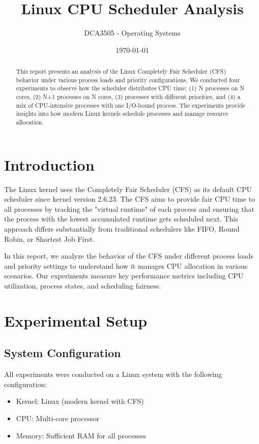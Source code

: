 \documentclass[12pt,a4paper]{article}
\title{\Large\textbf{Linux CPU Scheduler Analysis}}
\author{DCA3505 - Operating Systems}
\date{\today}
\begin{document}
\maketitle

\begin{abstract}
This report presents an analysis of the Linux Completely Fair Scheduler (CFS) behavior under various process loads and priority configurations. We conducted four experiments to observe how the scheduler distributes CPU time: (1) N processes on N cores, (2) N+1 processes on N cores, (3) processes with different priorities, and (4) a mix of CPU-intensive processes with one I/O-bound process. The experiments provide insights into how modern Linux kernels schedule processes and manage resource allocation.
\end{abstract}

\tableofcontents
\newpage

\section{Introduction}

The Linux kernel uses the Completely Fair Scheduler (CFS) as its default CPU scheduler since kernel version 2.6.23. The CFS aims to provide fair CPU time to all processes by tracking the "virtual runtime" of each process and ensuring that the process with the lowest accumulated runtime gets scheduled next. This approach differs substantially from traditional schedulers like FIFO, Round Robin, or Shortest Job First.

In this report, we analyze the behavior of the CFS under different process loads and priority settings to understand how it manages CPU allocation in various scenarios. Our experiments measure key performance metrics including CPU utilization, process states, and scheduling fairness.

\section{Experimental Setup}

\subsection{System Configuration}
All experiments were conducted on a Linux system with the following configuration:
\begin{itemize}
    \item Kernel: Linux (modern kernel with CFS)
    \item CPU: Multi-core processor
    \item Memory: Sufficient RAM for all processes
\end{itemize}
\end{document}
